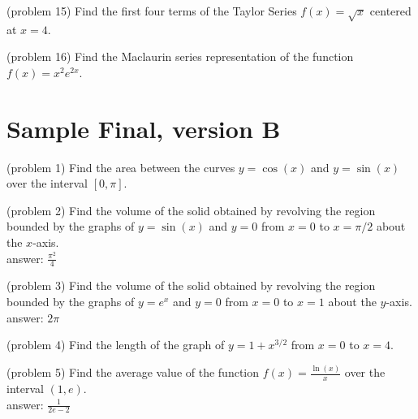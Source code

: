 \documentclass[handout]{ximera}
\begin{document}
\begin{problem}(problem 15)
Find the first four terms of the Taylor Series $f(x) = \sqrt x$ centered at $x = 4$.

\end{problem}



\begin{problem}(problem 16)
Find the Maclaurin series representation of the function $f(x) = x^2 e^{2x}$.

\end{problem}






\section{Sample Final, version B}


\begin{problem}(problem 1) 
Find the area between the curves $y = \cos(x)$ and $y=\sin(x)$ over the interval $[0, \pi]$.

\end{problem}



\begin{problem}(problem 2)
Find the volume of the solid obtained by revolving the region bounded by the graphs of $y = \sin(x)$ and $y = 0$
from $x = 0$ to $x = \pi/2$ about the $x$-axis.\\
answer: $\displaystyle \frac{\pi^2}{4}$

\end{problem}



\begin{problem}(problem 3)
Find the volume of the solid obtained by revolving the region bounded by the graphs of $y = e^x$ and $y = 0$
from $x = 0$ to $x = 1$ about the $y$-axis.\\
answer: $\displaystyle 2\pi$

\end{problem}



\begin{problem}(problem 4)
Find the length of the graph of 
$y = 1+ x^{3/2}$ 
from  $x = 0$ to $x = 4$.

\end{problem}



\begin{problem}(problem 5)
Find the average value of the function $f(x) = \frac{\ln(x)}{x}$ over the interval $(1,e)$.\\
answer: $\displaystyle \frac{1}{2e-2}$

\end{problem}
\end{document}
